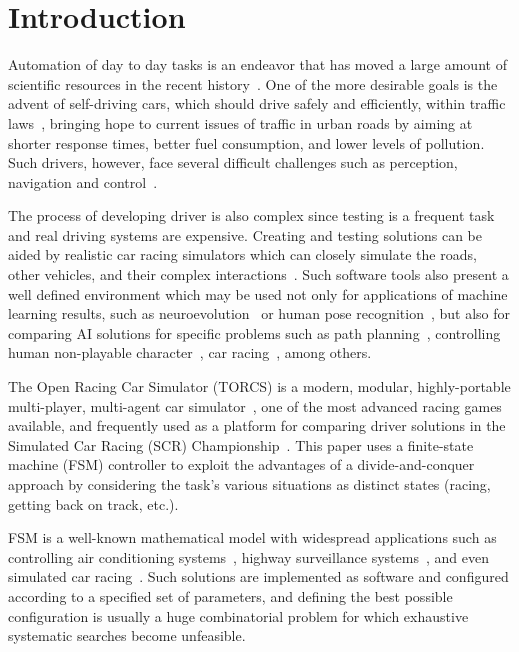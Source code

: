 \section{Introduction}\label{sec:1}
Automation of day to day tasks is an endeavor that has moved a large amount of scientific resources in the recent history~\cite{INDUS,APPLI}. One of the more desirable goals is the advent of self-driving cars, which should drive safely and efficiently, within traffic laws~\cite{SAFE,AUTOM}, bringing hope to current issues of traffic in urban roads by aiming at shorter response times, better fuel consumption, and lower levels of pollution. Such drivers, however, face several difficult challenges such as perception, navigation and control~\cite{6179503}.

The process of developing driver is also complex since testing is a frequent task and real driving systems are expensive. Creating and testing solutions can be aided by realistic car racing simulators which can closely simulate the roads, other vehicles, and their complex interactions~\cite{caldeira2013torcs}. Such software  tools also present a well defined environment which may be used not only for applications of machine learning results, such as neuroevolution~\cite{stanley_real-time_2005,5482132} or human pose recognition~\cite{Shotton:2011}, but also for comparing AI solutions for specific problems such as path planning~\cite{deFreitas:2012}, controlling human non-playable character~\cite{simon2008}, car racing~\cite{2009}, among others.

The Open Racing Car Simulator (TORCS) is a modern, modular, highly-portable multi-player, multi-agent car simulator~\cite{SIMUTORCS}, one of the most advanced racing games available, and frequently used as a platform for comparing driver solutions in the Simulated Car Racing (SCR) Championship~\cite{2009,Loiacono:2012:LEA:2212908.2212953}. This paper uses a finite-state machine (FSM) controller to exploit the advantages of a divide-and-conquer approach by considering the task's various situations as distinct states (racing, getting back on track, etc.).

FSM is a well-known mathematical model with widespread applications such as controlling air conditioning systems~\cite{BERNARD}, highway surveillance systems~\cite{DOHYUN}, and even simulated car racing~\cite{DIEGO}. Such solutions are implemented as software and configured according to a specified set of parameters, and defining the best possible configuration is usually a huge combinatorial problem for which exhaustive systematic searches become unfeasible.

